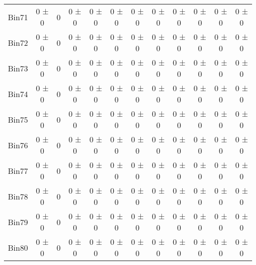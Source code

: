 \begin{tabular}{@{\extracolsep{4pt}}lccccccccccc@{}}
     Bin71 & 0 ± 0 & 0 & 0 ± 0 & 0 ± 0 & 0 ± 0 & 0 ± 0 & 0 ± 0 & 0 ± 0 & 0 ± 0 & 0 ± 0 & 0 ± 0 \\ 
     Bin72 & 0 ± 0 & 0 & 0 ± 0 & 0 ± 0 & 0 ± 0 & 0 ± 0 & 0 ± 0 & 0 ± 0 & 0 ± 0 & 0 ± 0 & 0 ± 0 \\ 
     Bin73 & 0 ± 0 & 0 & 0 ± 0 & 0 ± 0 & 0 ± 0 & 0 ± 0 & 0 ± 0 & 0 ± 0 & 0 ± 0 & 0 ± 0 & 0 ± 0 \\ 
     Bin74 & 0 ± 0 & 0 & 0 ± 0 & 0 ± 0 & 0 ± 0 & 0 ± 0 & 0 ± 0 & 0 ± 0 & 0 ± 0 & 0 ± 0 & 0 ± 0 \\ 
     Bin75 & 0 ± 0 & 0 & 0 ± 0 & 0 ± 0 & 0 ± 0 & 0 ± 0 & 0 ± 0 & 0 ± 0 & 0 ± 0 & 0 ± 0 & 0 ± 0 \\ 
     Bin76 & 0 ± 0 & 0 & 0 ± 0 & 0 ± 0 & 0 ± 0 & 0 ± 0 & 0 ± 0 & 0 ± 0 & 0 ± 0 & 0 ± 0 & 0 ± 0 \\ 
     Bin77 & 0 ± 0 & 0 & 0 ± 0 & 0 ± 0 & 0 ± 0 & 0 ± 0 & 0 ± 0 & 0 ± 0 & 0 ± 0 & 0 ± 0 & 0 ± 0 \\ 
     Bin78 & 0 ± 0 & 0 & 0 ± 0 & 0 ± 0 & 0 ± 0 & 0 ± 0 & 0 ± 0 & 0 ± 0 & 0 ± 0 & 0 ± 0 & 0 ± 0 \\ 
     Bin79 & 0 ± 0 & 0 & 0 ± 0 & 0 ± 0 & 0 ± 0 & 0 ± 0 & 0 ± 0 & 0 ± 0 & 0 ± 0 & 0 ± 0 & 0 ± 0 \\ 
     Bin80 & 0 ± 0 & 0 & 0 ± 0 & 0 ± 0 & 0 ± 0 & 0 ± 0 & 0 ± 0 & 0 ± 0 & 0 ± 0 & 0 ± 0 & 0 ± 0 \\ 
\hline\hline
  \end{tabular}

